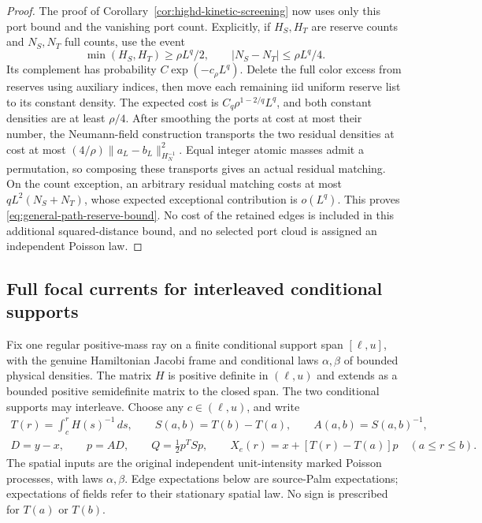 \documentclass[11pt,reqno]{amsart}
\theoremstyle{definition}
\theoremstyle{remark}
\numberwithin{equation}{section}
\begin{document}
\begin{proof}
The proof of Corollary~\ref{cor:highd-kinetic-screening} now uses only
this port bound and the vanishing port count. Explicitly, if $H_S,H_T$
are reserve counts and $N_S,N_T$ full counts, use the event
\[
 \min(H_S,H_T)\ge\rho L^q/2,\qquad
 |N_S-N_T|\le\rho L^q/4.
\]
Its complement has probability $C\exp(-c_\rho L^q)$. Delete the full
color excess from reserves using auxiliary indices, then move each
remaining iid uniform reserve list to its constant density. The expected
cost is $C_q\rho^{1-2/q}L^q$, and both constant densities are at least
$\rho/4$. After smoothing the ports at cost at most their number,
the Neumann-field construction transports the two residual densities
at cost at most $(4/\rho)\|a_L-b_L\|_{H_N^{-1}}^2$.
Equal integer atomic masses admit a permutation, so composing these
transports gives an actual residual matching. On the count exception,
an arbitrary residual matching costs at most $qL^2(N_S+N_T)$, whose
expected exceptional contribution is $o(L^q)$. This proves
\eqref{eq:general-path-reserve-bound}. No cost of the retained edges
is included in this additional squared-distance bound, and no selected
port cloud is assigned an independent Poisson law.
\end{proof}
\subsection{Full focal currents for interleaved conditional supports}
\label{subsec:interleaved-focal-current}

Fix one regular positive-mass ray on a finite conditional support span
\([\ell,u]\), with the genuine Hamiltonian Jacobi frame and conditional
laws \(\alpha,\beta\) of bounded physical densities. The matrix \(H\)
is positive definite in \((\ell,u)\) and extends as a bounded positive
semidefinite matrix to the closed span. The two conditional supports may
interleave. Choose any \(c\in(\ell,u)\), and write
\[
 \begin{gathered}
 T(r)=\int_c^rH(s)^{-1}\,ds,\qquad
 S(a,b)=T(b)-T(a),\qquad A(a,b)=S(a,b)^{-1},\\
 D=y-x,\qquad p=AD,\qquad Q=\tfrac12p^TSp,\qquad
 X_e(r)=x+[T(r)-T(a)]p\quad(a\le r\le b).
 \end{gathered}
\]
The spatial inputs are the original independent unit-intensity marked
Poisson processes, with laws \(\alpha,\beta\). Edge expectations below
are source-Palm expectations; expectations of fields refer to their
stationary spatial law. No sign is prescribed for \(T(a)\) or \(T(b)\).
\end{document}
